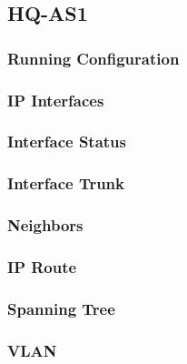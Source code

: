 \subsection{HQ-AS1}
\subsubsection{Running Configuration}


\subsubsection{IP Interfaces}


\subsubsection{Interface Status}


\subsubsection{Interface Trunk}


\subsubsection{Neighbors}


\subsubsection{IP Route}


\subsubsection{Spanning Tree}


\subsubsection{VLAN}



